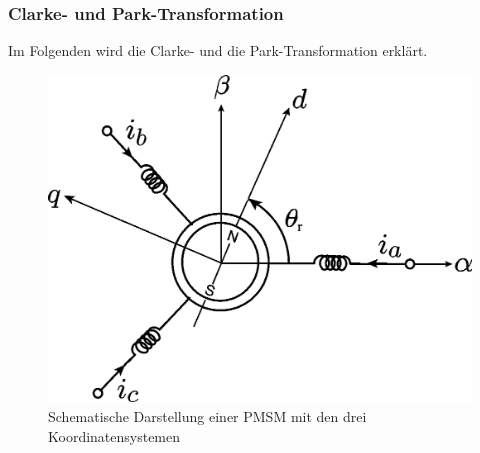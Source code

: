 \subsubsection{Clarke- und Park-Transformation}
Im Folgenden wird die Clarke- und die Park-Transformation erklärt. 
\begin{figure} [H]
	\centering
	\includegraphics[width=1\linewidth]{images/trafo_schematicPMSM}
	\caption{Schematische Darstellung einer PMSM mit den drei Koordinatensystemen }
	\label{fig:trafoschematicpmsm}
\end{figure}

